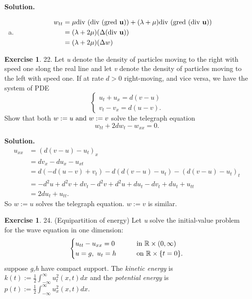 \message{ !name(PDE-hw5-21935004-\unexpanded{谭焱}.tex)}\documentclass[a4paper]{book}
\newenvironment{solution}%
{\noindent\textbf{Solution.}}%
{\qedhere}
\numberwithin{equation}{chapter}
\theoremstyle{definition}
\newtheorem{exc}[exm]{Exercise}
\begin{document}
\begin{multicols}{2}
\begin{solution}
\begin{enumerate} [(a)]
  \item
    \begin{align*}
      w_{tt} &= \mu \textmd{div } (\textmd{div } (\textmd{gred } \mathbf{u})) + (\lambda + \mu)\textmd{div } (\textmd{gred }\mathbf{(\textmd{div } u)})  \\
             &= (\lambda + 2\mu) (\Delta (\textmd{div } \mathbf{u})) \\
             &= (\lambda + 2\mu) ( \Delta w)
    \end{align*}
  \end{enumerate}
\end{solution}

\begin{exc}
  22.  Let \textit{u} denote the density of particles moving to the right with speed one slong the real line and let \textit{v} denote the density of particles moving to the left with speed one. If at rate $d > 0$ right-moving, and vice versa, we have the system of PDE
  \begin{equation}
    \label{eq:5}
    \begin{cases}
      u_t + u_x = d(v - u) \\
      v_t - v_x = d(u - v).
    \end{cases}
  \end{equation}
  Show that both $w := u \textmd{ and } w := v$ solve the telegraph equation
  \begin{equation}
    \label{eq:6}
    w_{tt} + 2d w_t - w_{xx} = 0.
  \end{equation}
\end{exc}

\begin{solution}
  \begin{align*}
    u_{xx} &= {(d(v - u) - u_t)}_x \\
           &= d v_x - d u_x - u_{xt} \\
           &= d(- d(u - v) + v_t) - d(d(v - u) - u_t) - {(d(v - u) - u_t)}_t \\
           &= - d^2 u + d^2 v + d v_t - d^2 v + d^2 u + d u_t - d v_t + d u_t + u_{tt} \\
           &= 2d u_t + u_{tt} .
  \end{align*}
  So $w:= u$ solves the telegraph equation. $w := v$ is similar.
\end{solution}

\begin{exc}
  24.  (Equipartition of energy) Let \textit{u} solve the initial-value problem for the wave equation in one dimension:
  \begin{align}
    \begin{cases}
      u_{tt} - u_{xx} = 0 \qquad &\textmd{in } \mathbb{R} \times (0, \infty) \\
      u = g,\ u_t = h \qquad   &\textmd{on } \mathbb{R} \times \{t = 0\}.
    \end{cases}
  \end{align}
  suppose \textit{g,h} have compact support. The \textit{kinetic energy} is $k(t) := \frac{1}{2} \int_{- \infty}^{\infty} u_t^2(x,t) dx$ and the \textit{potential energy} is $p(t) := \frac{1}{2} \int_{-\infty}^{\infty} u_x^2(x,t) dx$.


\end{exc}
\end{multicols}
\end{document}
